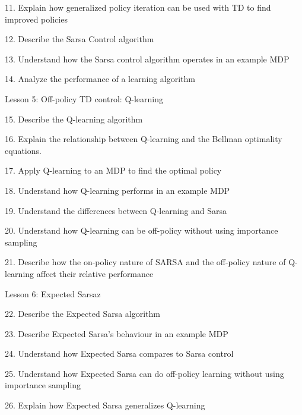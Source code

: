 \documentclass[sutton_barto_notes.tex]{subfiles}
\begin{document}
11. Explain how generalized policy iteration can be used with TD to find improved policies

12. Describe the Sarsa Control algorithm

13. Understand how the Sarsa control algorithm operates in an example MDP

14. Analyze the performance of a learning algorithm

Lesson 5: Off-policy TD control: Q-learning

15. Describe the Q-learning algorithm

16. Explain the relationship between Q-learning and the Bellman optimality equations.

17. Apply Q-learning to an MDP to find the optimal policy

18. Understand how Q-learning performs in an example MDP

19. Understand the differences between Q-learning and Sarsa

20. Understand how Q-learning can be off-policy without using importance sampling

21. Describe how the on-policy nature of SARSA and the off-policy nature of Q-learning affect their relative performance

Lesson 6: Expected Sarsaz

22. Describe the Expected Sarsa algorithm

23. Describe Expected Sarsa’s behaviour in an example MDP

24. Understand how Expected Sarsa compares to Sarsa control

25. Understand how Expected Sarsa can do off-policy learning without using importance sampling

26. Explain how Expected Sarsa generalizes Q-learning
\end{document}
